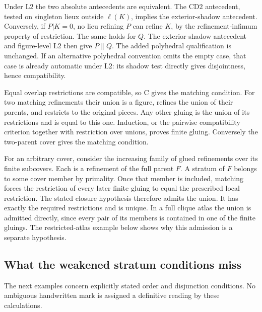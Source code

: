 Under $\mathrm L2$ the two absolute antecedents are equivalent.
The $\mathrm{CD2}$ antecedent, tested on singleton lieux outside
$\ell(K)$, implies the exterior-shadow antecedent. Conversely,
if $P|K=0$, no lieu refining $P$ can refine $K$, by the
refinement-infimum property of restriction. The same holds for
$Q$. The exterior-shadow antecedent and figure-level $\mathrm L2$
then give $P\parallel Q$. The added polyhedral qualification is
unchanged. If an alternative polyhedral convention omits the
empty case, that case is already automatic under $\mathrm L2$:
its shadow test directly gives disjointness, hence compatibility.

Equal overlap restrictions are compatible, so $\mathrm C$ gives
the matching condition. For two matching refinements their union
is a figure, refines the union of their parents, and restricts to
the original pieces. Any other gluing is the union of its
restrictions and is equal to this one. Induction, or the
pairwise compatibility criterion together with restriction over
unions, proves finite gluing. Conversely the two-parent cover
gives the matching condition.

For an arbitrary cover, consider the increasing family of glued
refinements over its finite subcovers. Each is a refinement of
the full parent $F$. A stratum of $F$ belongs to some cover
member by primality. Once that member is included, matching
forces the restriction of every later finite gluing to equal
the prescribed local restriction. The stated closure hypothesis
therefore admits the union. It has exactly the required
restrictions and is unique. In a full clique atlas the union is
admitted directly, since every pair of its members is contained
in one of the finite gluings. The restricted-atlas example below
shows why this admission is a separate hypothesis.

\subsection{What the weakened stratum conditions miss}
The next examples concern explicitly stated order and disjunction
conditions. No ambiguous handwritten mark is assigned a definitive
reading by these calculations.

